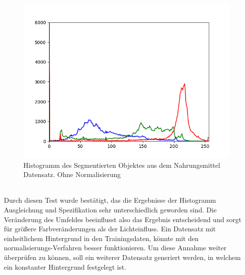 \documentclass[a4paper,12pt,oneside]{article}
\begin{document}
\begin{figure}[htb]
\begin{minipage}[c]{0.08\textwidth}
\end{minipage}
\hfill
\begin{minipage}[c]{0.3\textwidth}
\includegraphics[width=\textwidth]{Sources/Bild2_histo.png}
\end{minipage}
\caption{Histogramm des Segmentierten Objektes aus dem Nahrungsmittel Datensatz. Ohne Normalisierung}
\label{img:evalnorm}
\end{figure}\\
Durch diesen Test wurde bestätigt, das die Ergebnisse der Histogramm Ausgleichung und Spezifikation sehr unterschiedlich geworden sind. Die Veränderung des Umfeldes beeinflusst also das Ergebnis entscheidend und sorgt für größere Farbveränderungen als der Lichteinfluss.
Ein Datensatz mit einheitlichem Hintergrund in den Trainingsdaten, könnte mit den normalisierungs-Verfahren besser funktionieren. Um diese Annahme weiter überprüfen zu können, soll ein weiterer Datensatz generiert werden, in welchem ein konstanter Hintergrund festgelegt ist. 
\end{document}
